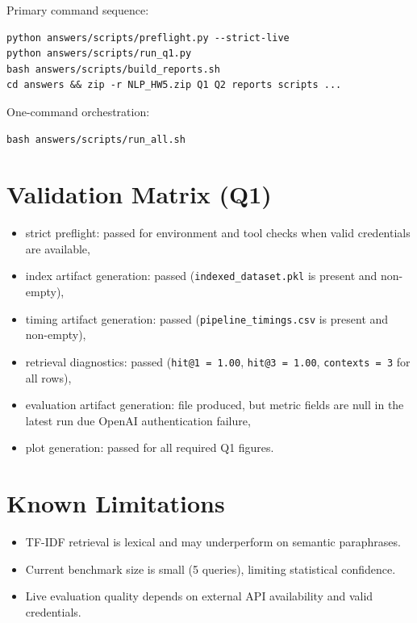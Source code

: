\documentclass[12pt,a4paper]{article}
\begin{document}
Primary command sequence:
\begin{verbatim}
python answers/scripts/preflight.py --strict-live
python answers/scripts/run_q1.py
bash answers/scripts/build_reports.sh
cd answers && zip -r NLP_HW5.zip Q1 Q2 reports scripts ...
\end{verbatim}

One-command orchestration:
\begin{verbatim}
bash answers/scripts/run_all.sh
\end{verbatim}

\section{Validation Matrix (Q1)}
\begin{itemize}
\item strict preflight: passed for environment and tool checks when valid credentials are available,
\item index artifact generation: passed (\texttt{indexed\_dataset.pkl} is present and non-empty),
\item timing artifact generation: passed (\texttt{pipeline\_timings.csv} is present and non-empty),
\item retrieval diagnostics: passed (\texttt{hit@1 = 1.00}, \texttt{hit@3 = 1.00}, \texttt{contexts = 3} for all rows),
\item evaluation artifact generation: file produced, but metric fields are null in the latest run due OpenAI authentication failure,
\item plot generation: passed for all required Q1 figures.
\end{itemize}

\section{Known Limitations}
\begin{itemize}
\item TF-IDF retrieval is lexical and may underperform on semantic paraphrases.
\item Current benchmark size is small (5 queries), limiting statistical confidence.
\item Live evaluation quality depends on external API availability and valid credentials.
\end{itemize}
\end{document}
